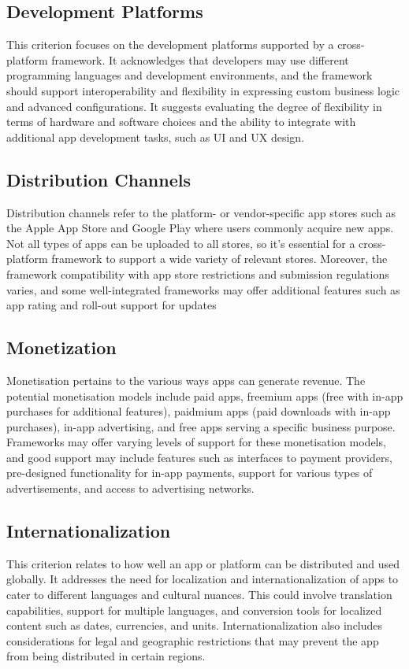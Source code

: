 \subsection{Development Platforms} 
This criterion focuses on the development platforms supported by a cross-platform framework. It acknowledges that developers may use different programming languages and development environments, and the framework should support interoperability and flexibility in expressing custom business logic and advanced configurations. It suggests evaluating the degree of flexibility in terms of hardware and software choices and the ability to integrate with additional app development tasks, such as UI and UX design.

\subsection{Distribution Channels} 
Distribution channels refer to the platform- or vendor-specific app stores such as the Apple App Store and Google Play where users commonly acquire new apps. Not all types of apps can be uploaded to all stores, so it's essential for a cross-platform framework to support a wide variety of relevant stores. Moreover, the framework compatibility with app store restrictions and submission regulations varies, and some well-integrated frameworks may offer additional features such as app rating and roll-out support for updates

\subsection{Monetization}
Monetisation pertains to the various ways apps can generate revenue. The potential monetisation models include paid apps, freemium apps (free with in-app purchases for additional features), paidmium apps (paid downloads with in-app purchases), in-app advertising, and free apps serving a specific business purpose. Frameworks may offer varying levels of support for these monetisation models, and good support may include features such as interfaces to payment providers, pre-designed functionality for in-app payments, support for various types of advertisements, and access to advertising networks.

\subsection{Internationalization}
This criterion relates to how well an app or platform can be distributed and used globally. It addresses the need for localization and internationalization of apps to cater to different languages and cultural nuances. This could involve translation capabilities, support for multiple languages, and conversion tools for localized content such as dates, currencies, and units. Internationalization also includes considerations for legal and geographic restrictions that may prevent the app from being distributed in certain regions.

